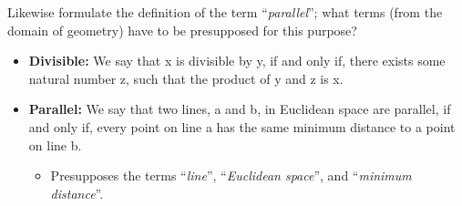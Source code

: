 \begin{enumerate}
  Likewise formulate the definition of the term ``\emph{parallel}'';
  what terms (from the domain of geometry) have to be presupposed for
  this purpose?
  \begin{itemize}
  \item \textbf{Divisible:} We say that x is divisible by y, if and
    only if, there exists some natural number z, such that the product
    of y and z is x.
  \item \textbf{Parallel:} We say that two lines, a and b, in
    Euclidean space are parallel, if and only if, every point on line
    a has the same minimum distance to a point on line b.
    \begin{itemize}
      \item Presupposes the terms ``\emph{line}'', ``\emph{Euclidean space}'', and
        ``\emph{minimum distance}''.
    \end{itemize}
  \end{itemize}

\end{enumerate}
